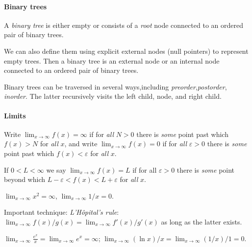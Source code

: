 \paragraph{Binary trees}

A \emph{binary tree} is either empty or consists of a \emph{root} node connected to an ordered pair of binary trees. 
 
We can also define them using explicit external nodes (null pointers) to represent empty trees. Then a binary tree is an external node or an internal node connected to an ordered pair of binary trees.
 
Binary trees can be traversed in several ways,including \emph{preorder},\emph{postorder}, \emph{inorder}. The latter recursively visits the left child, node, and right child.

\paragraph{Limits}

Write $\lim_{x\to \infty} f(x) = \infty$ if for \emph{all} $N>0$ there is \emph{some} point past which $f(x) > N$ for \emph{all} $x$, and write $\lim_{x\to\infty} f(x) = 0$ if for \emph{all} $\varepsilon>0$ there is \emph{some} point past which $f(x) < \varepsilon$ for \emph{all} $x$.

If $0 < L < \infty$ we say $\lim_{x\to\infty} f(x) = L$ if for all $\varepsilon > 0$ there is \emph{some} point beyond which $L - \varepsilon < f(x) < L + \varepsilon$ for \emph{all} $x$.

\begin{Example}
$\lim_{x\to\infty} x^2 = \infty$, $\lim_{x\to \infty} 1/x = 0$.
\end{Example}

Important technique: \emph{L'H\^{o}pital's rule}: $\lim_{x\to \infty} f(x)/g(x) = \lim_{x\to \infty} f'(x)/g'(x)$ as long as the latter exists. 

\begin{Example}
 $\lim_{x\to\infty} \frac{e^x}{x} = \lim_{x\to\infty} e^x = \infty$; $\lim_{x\to\infty} (\ln x)/x = \lim_{x\to\infty} (1/x)/1 = 0$.
 \end{Example}



